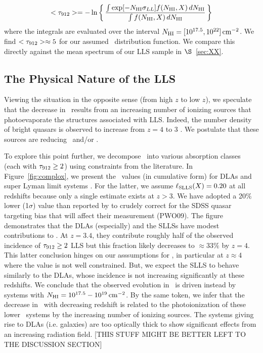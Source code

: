 \documentclass[12pt,preprint]{aastex}
\begin{document}
\begin{equation}
<\tau_{\rm 912}> = - \ln \left \{ \,
\frac{\int \exp[-N_{\rm HI} \sigma_{LL}] f(N_{\rm HI},X) \, dN_{\rm HI}}{\int f(N_{\rm HI},X) \, dN_{\rm HI}}
\, \right \}
\label{eqn:avgtau}
\end{equation}
where the integrals are evaluated over the interval
$N_{\rm HI} = [10^{17.5},10^{22}] \, {\rm cm^{-2}}$.
We find $<\tau_{\rm 912}> \approx 5$ for our assumed \fnhi\ distribution function.
We compare this directly against the mean spectrum of our LLS sample in 
$\S$~\ref{sec:XX}.



\subsection{The Physical Nature of the LLS}

Viewing the situation in the opposite sense (from high $z$ to low $z$),
we speculate that the decrease in \llls\ results from an increasing
number of ionizing sources that photoevaporate the structures associated
with LLS.   
Indeed, the number density of 
bright quasars is observed to increase from $z=4$ to 3 \citep{qsoevol}.
We postulate that these sources are 
reducing \nlls\ and/or \slls.

To explore this point further,  we
decompose \llls\ into various absorption classes (each with $\tau_{\rm 912} \ge 2$)
using constraints from the literature.
In Figure~\ref{fig:complox}, we present the \llls\ values (in cumulative
form) for DLAs \citep{pw09} and super Lyman limit systems 
\citep[SLLS, absorbers with $\mnhi = 10^{19} - 10^{20.3} \cm{-2}$;][]{opb+07}.
For the latter, we assume $\ell_{\rm SLLS}(X) = 0.20$ at all redshifts because
only a single estimate exists at $z>3$. 
We have adopted a 20$\%$ lower (1$\sigma$) value than reported
by \cite{opb+07} to crudely correct for the SDSS quasar targeting bias
that will affect their measurement (PWO09). 
The figure demonstrates that the DLAs (especially) and 
the SLLSs have modest contributions to \llls.
At $z=3.4$, they contribute roughly half of the observed incidence
of $\tau_{\rm 912} \ge 2$ LLS but this fraction likely decreases to
$\approx 33\%$ by $z=4$.  This latter conclusion hinges on our asssumptions for 
\lslls, in particular at $z \approx 4$ where the value is not
well constrained.  But, we expect the SLLS to behave similarly
to the DLAs, whose incidence is not increasing significantly at these
redshifts.  We conclude that the observed evolution in \llls\
is driven instead by systems with 
$N_{\rm HI} = 10^{17.5} - 10^{19} \, {\rm cm^{-2}}$.
By the same token, we infer that the decrease in \llls\ with 
decreasing redshift is related to the photoionization 
of these lower \nhi\ systems by the increasing number
of ionizing sources.  The systems giving rise to DLAs (i.e. galaxies)
are too optically thick to show significant effects 
from an increasing radiation field.
[THIS STUFF MIGHT BE BETTER LEFT TO THE DISCUSSION SECTION]
\end{document}

